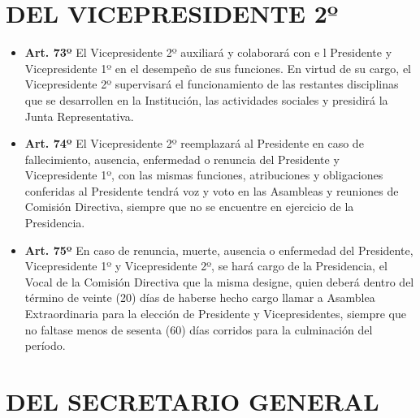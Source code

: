 \documentclass[]{book}
\providecommand{\tightlist}{%
  \setlength{\itemsep}{0pt}\setlength{\parskip}{0pt}}
\begin{document}
\chapter{DEL VICEPRESIDENTE 2º}\label{cap10}

\begin{itemize}
\tightlist
\item
  \textbf{Art. 73º} El Vicepresidente 2º auxiliará y colaborará con e l
  Presidente y Vicepresidente 1º en el desempeño de sus funciones. En
  virtud de su cargo, el Vicepresidente 2º supervisará el funcionamiento
  de las restantes disciplinas que se desarrollen en la Institución, las
  actividades sociales y presidirá la Junta Representativa.
\end{itemize}

\begin{itemize}
\tightlist
\item
  \textbf{Art. 74º} El Vicepresidente 2º reemplazará al Presidente en
  caso de fallecimiento, ausencia, enfermedad o renuncia del Presidente
  y Vicepresidente 1º, con las mismas funciones, atribuciones y
  obligaciones conferidas al Presidente tendrá voz y voto en las
  Asambleas y reuniones de Comisión Directiva, siempre que no se
  encuentre en ejercicio de la Presidencia.
\end{itemize}

\begin{itemize}
\tightlist
\item
  \textbf{Art. 75º} En caso de renuncia, muerte, ausencia o enfermedad
  del Presidente, Vicepresidente 1º y Vicepresidente 2º, se hará cargo
  de la Presidencia, el Vocal de la Comisión Directiva que la misma
  designe, quien deberá dentro del término de veinte (20) días de
  haberse hecho cargo llamar a Asamblea Extraordinaria para la elección
  de Presidente y Vicepresidentes, siempre que no faltase menos de
  sesenta (60) días corridos para la culminación del período.
\end{itemize}

\chapter{DEL SECRETARIO GENERAL}\label{cap11}
\end{document}
